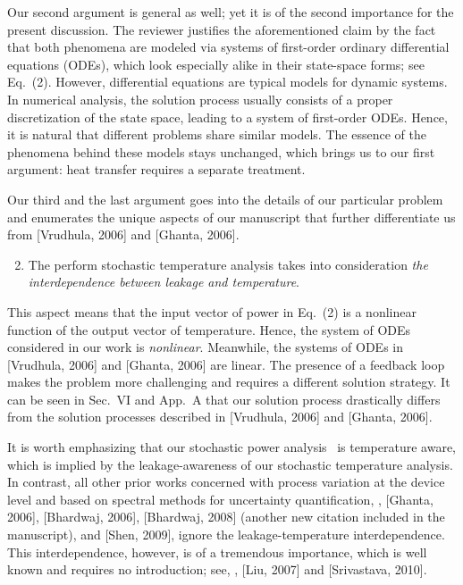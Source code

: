 \begin{authors}
Our second argument is general as well; yet it is of the second importance for the present discussion.
The reviewer justifies the aforementioned claim by the fact that both phenomena are modeled via systems of first-order ordinary differential equations (ODEs), which look especially alike in their state-space forms; see Eq.~(2).
However, differential equations are typical models for dynamic systems.
In numerical analysis, the solution process usually consists of a proper discretization of the state space, leading to a system of first-order ODEs.
Hence, it is natural that different problems share similar models.
The essence of the phenomena behind these models stays unchanged, which brings us to our first argument: heat transfer requires a separate treatment.

Our third and the last argument goes into the details of our particular problem and enumerates the unique aspects of our manuscript that further differentiate us from [Vrudhula, 2006] and [Ghanta, 2006].
\begin{enumerate}
  \setcounter{enumi}{1}
  \item The perform stochastic temperature analysis takes into consideration \emph{the interdependence between leakage and temperature}.
\end{enumerate}
This aspect means that the input vector of power in Eq.~(2) is a nonlinear function of the output vector of temperature.
Hence, the system of ODEs considered in our work is \emph{nonlinear}.
Meanwhile, the systems of ODEs in [Vrudhula, 2006] and [Ghanta, 2006] are linear.
The presence of a feedback loop makes the problem more challenging and requires a different solution strategy.
It can be seen in Sec.~VI and App.~A that our solution process drastically differs from the solution processes described in [Vrudhula, 2006] and [Ghanta, 2006].

It is worth emphasizing that our stochastic power analysis \perse\ is temperature aware, which is implied by the leakage-awareness of our stochastic temperature analysis.
In contrast, all other prior works concerned with process variation at the device level and based on spectral methods for uncertainty quantification, \ie, [Ghanta, 2006], [Bhardwaj, 2006], [Bhardwaj, 2008] (another new citation included in the manuscript), and [Shen, 2009], ignore the leakage-temperature interdependence.
This interdependence, however, is of a tremendous importance, which is well known and requires no introduction; see, \eg, [Liu, 2007] and [Srivastava, 2010].


\end{authors}
